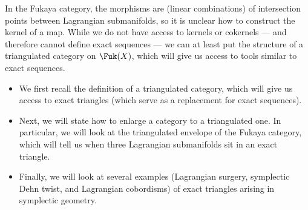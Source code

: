 \begin{exposition}
In the Fukaya category, the morphisms are (linear combinations) of intersection points between Lagrangian submanifolds, so it is unclear how to construct the kernel of a map.
While we do not have access to kernels or cokernels --- and therefore cannot define exact sequences --- we can at least put the structure of a triangulated category on $\Fuk(X)$, which will give us access to tools similar to exact sequences. 

\begin{itemize}
    \item We first recall the definition of a triangulated category, which will give us access to exact triangles (which serve as a replacement for exact sequences).
    \item Next, we will state how to enlarge a category to a triangulated one. In particular, we will look at the triangulated envelope of the Fukaya category, which will tell us when three Lagrangian submanifolds sit in an exact triangle.
    \item Finally, we will look at several examples (Lagrangian surgery, symplectic Dehn twist, and Lagrangian cobordisms) of exact triangles arising in symplectic geometry.
\end{itemize}









    \end{exposition}